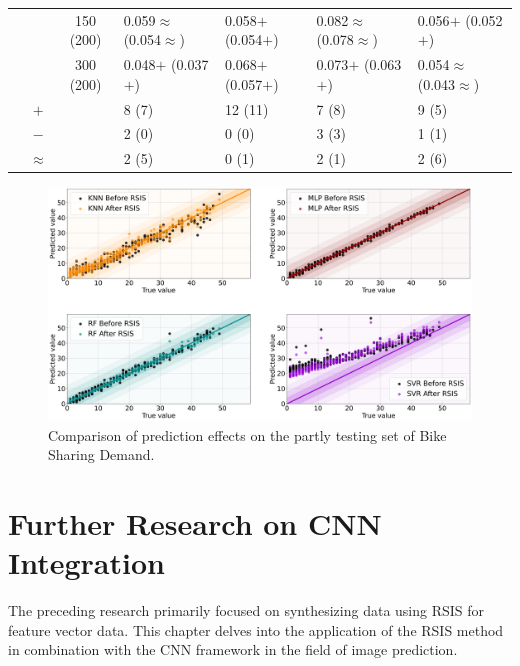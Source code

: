 \documentclass[final,3p,times]{elsarticle}
\begin{document}
\begin{table}
\begin{tabularx}{\textwidth}{cccXXXX}
    &  & 150 (200) & 0.059$\approx$ (0.054$\approx$) & 0.058$+$ (0.054$+$) & 0.082$\approx$ (0.078$\approx$) & 0.056$+$ (0.052$+$) \\
    &  & 300 (200) & 0.048$+$ (0.037$+$) & 0.068$+$ (0.057$+$) & 0.073$+$ (0.063$+$) & 0.054$\approx$ (0.043$\approx$) \\
  \cmidrule{1-7}
    & $+$ &  & 8 (7) & 12 (11) & 7 (8) & 9 (5) \\
    & $-$ &  & 2 (0) & 0 (0) & 3 (3) & 1 (1) \\
    & $\approx$ &  & 2 (5) & 0 (1) & 2 (1) & 2 (6) \\
  \bottomrule
  \end{tabularx}
\end{table}

\begin{figure}[h!]
  \centering
  \includegraphics[scale=0.28]{Fig6.png}
  \caption{Comparison of prediction effects on the partly testing 
  set of Bike Sharing Demand.}
  \label{Fig6}
\end{figure}





\newpage
\section{Further Research on CNN Integration}
The preceding research primarily focused on synthesizing data 
using RSIS for feature vector data. This chapter delves into the 
application of the RSIS method in combination with the CNN 
framework in the field of image prediction.
\end{document}

